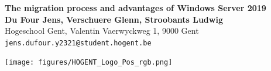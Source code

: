 \documentclass[a0,portrait]{a0poster}
\begin{document}
\begin{minipage}[t]{0.75\linewidth}
\VeryHuge \color{HoGentAccent1} \textbf{The migration process and advantages of Windows Server 2019} \color{Black}\\ %
\huge \textbf{Du Four Jens, Verschuere Glenn, Stroobants Ludwig}\\[0.5cm] %
\huge Hogeschool Gent, Valentin Vaerwyckweg 1, 9000 Gent\\[0.4cm] %
\Large \texttt{jens.dufour.y2321@student.hogent.be} \\
\end{minipage}
\begin{minipage}[t]{0.25\linewidth}
\texttt{[image: figures/HOGENT\_Logo\_Pos\_rgb.png]} 
\end{minipage}
\vspace{1cm} %
\end{document}
